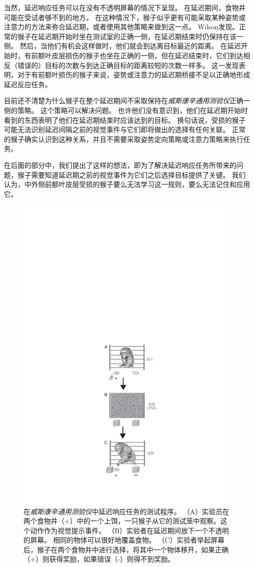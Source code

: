 当然，延迟响应任务可以在没有不透明屏幕的情况下呈现。
在延迟期间，食物井可能在受试者够不到的地方。
在这种情况下，猴子似乎更有可能采取某种姿势或注意力的方法来弥合延迟期，或者使用其他策略来做到这一点。
Wilson\cite{wilson1963effect}发现。正常的猴子在延迟期开始时坐在测试室的正确一侧，在延迟期结束时仍保持在该一侧。
然后，当他们有机会这样做时，他们就会到达离目标最近的距离。
在延迟开始时，有前额叶皮层损伤的猴子也坐在正确的一侧，但在延迟结束时，它们到达相反（错误的）目标的次数与到达正确目标的距离较短的次数一样多。
这一发现表明，对于有前额叶损伤的猴子来说，姿势或注意力的延迟期桥接不足以正确地形成延迟反应任务。


目前还不清楚为什么猴子在整个延迟期间不采取保持在\textit{威斯康辛通用测验仪}正确一侧的策略。
这个策略可以解决问题。
也许他们没有意识到，他们在延迟期开始时看到的东西表明了他们在延迟期结束时应该达到的目标。
换句话说，受损的猴子可能无法识别延迟间隔之前的视觉事件与它们即将做出的选择有任何关联。
正常的猴子确实认识到这种关系，并且不需要采取姿势定向策略或注意力策略来执行任务。


在后面的部分中，我们提出了这样的想法，即为了解决延迟响应任务所带来的问题，猴子需要知道延迟期之前的视觉事件为它们之后选择目标提供了关键。
我们认为，中外侧前额叶皮层受损的猴子要么无法学习这一规则，要么无法记住和应用它。


\begin{figure}
	\centering
	\includegraphics[width=0.32\linewidth]{chap6/6_3}
	\caption{在\textit{威斯康辛通用测验仪}中延迟响应任务的测试程序。
		（A）实验员在两个食物井（+）中的一个上饵，一只猴子从它的测试笼中观察。这个动作作为视觉提示事件。
		（B）实验者在延迟期间放下一个不透明的屏幕。
		相同的物体可以很好地覆盖食物。
		（C）实验者举起屏幕后，猴子在两个食物井中进行选择，将其中一个物体移开，如果正确（+）则获得奖励，如果错误（-）则得不到奖励\cite{murray1991contributions}。}
	\label{fig:6_3}
\end{figure}



